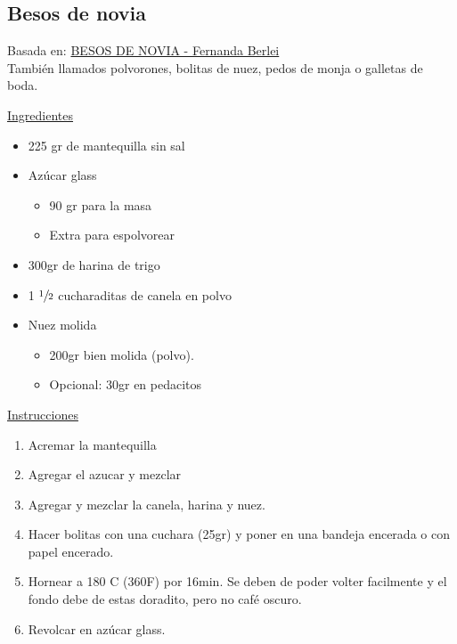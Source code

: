 \subsection{Besos de novia}

Basada en: \href{https://www.youtube.com/watch?v=V18ECzDqUjM}{BESOS DE NOVIA - Fernanda Berlei
} \\

También llamados polvorones, bolitas de nuez, pedos de monja o galletas de boda.

\underline{Ingredientes}

\begin{itemize}
\item 225 gr de mantequilla sin sal
\item Azúcar glass
\begin{itemize}
\item 90 gr para la masa
\item Extra para espolvorear
\end{itemize}
\item 300gr de harina de trigo
\item 1 $\sfrac{1}{2}$ cucharaditas de canela en polvo
\item Nuez molida
\begin{itemize}
\item 200gr bien molida (polvo).
\item Opcional: \Sim 30gr en pedacitos
\end{itemize}
\end{itemize}


\underline{Instrucciones}

\begin{enumerate}
\item Acremar la mantequilla
\item Agregar el azucar y mezclar
\item Agregar y mezclar la canela, harina y nuez.
\item Hacer bolitas con una cuchara (\Sim 25gr) y poner en una bandeja encerada o con papel encerado.
\item Hornear a 180 C (360F) por \Sim 16min. Se deben de poder volter facilmente y el fondo debe de estas doradito, pero no café oscuro.
\item Revolcar en azúcar glass.
\end{enumerate}

